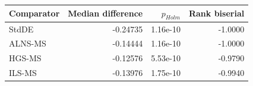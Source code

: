 \begin{tabular}{lrrr}
\toprule
Comparator & Median difference & $p_{Holm}$ & Rank biserial \\
\midrule
StdDE & -0.24735 & 1.16e-10 & -1.0000 \\
ALNS-MS & -0.14444 & 1.16e-10 & -1.0000 \\
HGS-MS & -0.12576 & 5.53e-10 & -0.9790 \\
ILS-MS & -0.13976 & 1.75e-10 & -0.9940 \\
\bottomrule
\end{tabular}
